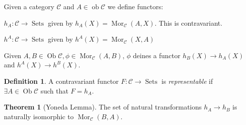 \documentclass{article}
\theoremstyle{definition}
\newtheorem*{definition}{Definition}
\newtheorem{theorem}{Theorem}
\begin{document}
    Given a category \(\mathcal{C}\) and \(A \in \operatorname{ob} \mathcal{C}\) we define functors:

    \(h_A: \mathcal{C} \to \operatorname{Sets}\) given by \(h_A(X) = \operatorname{Mor}_{\mathcal{C}} (A,X)\). This is contravariant.

    \(h^A: \mathcal{C} \to \operatorname{Sets}\) given by \(h^A(X) = \operatorname{Mor}_{\mathcal{C}} (X,A)\)

    Given \(A,B \in \operatorname{Ob} \mathcal{C}, \phi \in \operatorname{Mor}_{\mathcal{C}} (A,B)\), \(\phi\) deines a functor \(h_B(X) \to h_A(X)\) and \(h^A(X) \to h^B(X)\).

    \begin{definition}
        A contravariant functor \(F: \mathcal{C} \to \operatorname{Sets}\) is \textit{representable} if \(\exists A \in \operatorname{Ob} \mathcal{C}\) such that \(F = h_A\).
    \end{definition}

    \begin{theorem}
        [Yoneda Lemma] The set of natural transformations \(h_A \to h_B\) is naturally isomorphic to \(\operatorname{Mor}_{\mathcal{C}}(B,A)\).
    \end{theorem}
\end{document}
